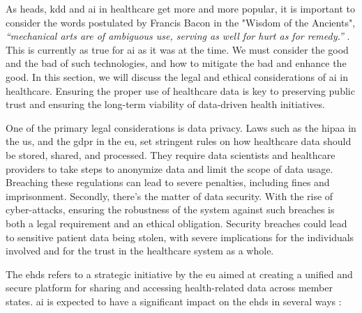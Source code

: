 
As \ac{heads}, \ac{kdd} and \ac{ai} in healthcare get more and more popular, it is important to consider the words postulated by Francis Bacon in the "Wisdom of the Ancients", \textit{“mechanical arts are of ambiguous use, serving as well for hurt as for remedy.” } \cite{bacon_2011}. This is currently as true for \ac{ai} as it was at the time. We must consider the good and the bad of such technologies, and how to mitigate the bad and enhance the good. In this section, we will discuss the legal and ethical considerations of \ac{ai} in healthcare. Ensuring the proper use of healthcare data is key to preserving public trust and ensuring the long-term viability of data-driven health initiatives.

One of the primary legal considerations is data privacy. Laws such as the \ac{hipaa} in the \ac{us}, and the \ac{gdpr} in the \ac{eu}, set stringent rules on how healthcare data should be stored, shared, and processed. They require data scientists and healthcare providers to take steps to anonymize data and limit the scope of data usage. Breaching these regulations can lead to severe penalties, including fines and imprisonment.
Secondly, there's the matter of data security. With the rise of cyber-attacks, ensuring the robustness of the system against such breaches is both a legal requirement and an ethical obligation. Security breaches could lead to sensitive patient data being stolen, with severe implications for the individuals involved and for the trust in the healthcare system as a whole.


The \ac{ehds} refers to a strategic initiative by the \ac{eu} aimed at creating a unified and secure platform for sharing and accessing health-related data across member states. \ac{ai} is expected to have a significant impact on the \ac{ehds} in several ways \cite{ehds}:

